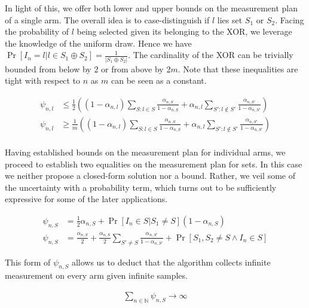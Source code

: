 In light of this, we offer both lower and upper bounds on the measurement plan of
a single arm. The overall idea is to case-distinguish if $l$ lies set $S_1$ or
$S_2$. Facing the probability of $l$ being selected given its belonging to the
XOR, we leverage the knowledge of the uniform draw. Hence we have $\Pr[I_n = l|l
\in S_1 \oplus S_2] = \frac{1}{|S_1 \oplus S_2|}$. The cardinality of the XOR
can be trivially bounded from below by 2 or from above by 2$m$. Note that these
inequalities are tight with respect to $n$ as $m$ can be seen as a constant.
\begin{proposition}\label{proposition:measurement_plan_arm}
  \begin{align}
    \psi_{n, l} &\leq \frac{1}{2}((1 - \alpha_{n, l}) \sum_{S: l \in S}
        \frac{\alpha_{n, S}}{1 - \alpha_{n, S}} + \alpha_{n, l} \sum_{S': l
        \notin S'} \frac{\alpha_{n, S'}}{1 - \alpha_{n, S'}}) \\
    \psi_{n, l} &\geq \frac{1}{m}((1 - \alpha_{n, l}) \sum_{S: l \in S}
        \frac{\alpha_{n, S}}{1 - \alpha_{n, S}} + \alpha_{n, l} \sum_{S': l
        \notin S'} \frac{\alpha_{n, S'}}{1 - \alpha_{n, S'}}) \\
  \end{align}
\end{proposition}
Having established bounds on the measurement plan for individual arms, we
proceed to establish two equalities on the measurement plan for sets. In this
case we neither propose a closed-form solution nor a bound. Rather, we veil some
of the uncertainty with a probability term, which turns out to be sufficiently
expressive for some of the later applications.
\begin{proposition}\label{proposition:measurement_pan_set}
  \begin{align}
    \psi_{n, S} &= \frac{1}{2} \alpha_{n, S} +  \Pr[I_n \in S | S_1 \neq S] (1 - \alpha_{n, S}) \\
    \psi_{n, S} &= \frac{\alpha_{n, S}}{2} +  \frac{\alpha_{n, S}}{2} \sum_{S'\neq S} \frac{\alpha_{n, S'}}{1 - \alpha_{n, S'}} + \Pr[S_1, S_2 \neq S \wedge I_n \in S]
  \end{align}
\end{proposition}
This form of $\psi_{n, S}$ allows us to deduct that the algorithm collects infinite measurement on every arm given infinite samples.
\begin{lemma}\label{lemma:infinite_measurement}
  \begin{align}
    \sum_{n \in \mathbb{N}} \psi_{n, S} \rightarrow \infty
  \end{align}
\end{lemma}
